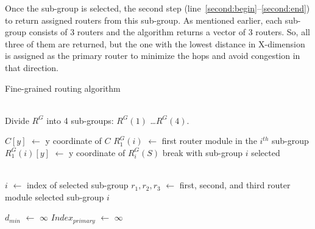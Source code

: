 Once the sub-group is selected, the second step (line~\ref{second:begin}--\ref{second:end}) to return assigned routers from this sub-group.
As mentioned earlier, each sub-group consists of 3 routers and the algorithm returns a vector of 3 routers. So, all three of them are 
returned, but the one with the lowest distance in X-dimension is assigned as the primary router to minimize the hops and avoid congestion 
in that direction. 


\begin{algorithm}
\caption{Fine-grained routing algorithm}
\label{alg:fgr}
\begin{algorithmic}[1]
 \\ 
\State Divide $R^G$ into 4 sub-groups: $R^G(1)$ \ldots $R^G(4)$.

 
\label{first:begin}
    \State $C[y]$ $\leftarrow$ y coordinate of $C$
    \State $R^G_{1}(i)$ $\leftarrow$ first router module in the $i^{th}$ sub-group
    \State $R^G_{1}(i)[y]$ $\leftarrow$ y coordinate of $R^G_{i}(S)$
    \State break with sub-group $i$ selected
    \EndIf
\EndFor
\label{first:end}

\\ 

\State $i$ $\leftarrow$ index of selected sub-group
\label{second:begin}
\State $r_1, r_2, r_3$ $\leftarrow$ first, second, and third router module 
\State \hspace{\algorithmicindent} selected sub-group $i$

\State $d_{min}$ $\leftarrow$ $\infty$ 
\State $Index_{primary}$ $\leftarrow$ $\infty$

\\


\end{algorithmic}
\end{algorithm}
